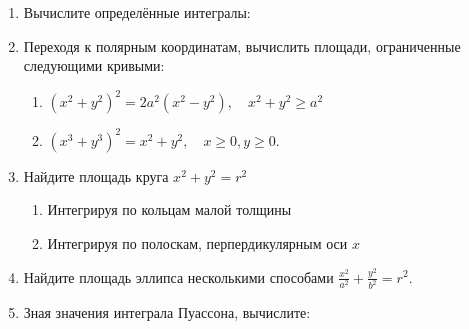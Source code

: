 \begin{enumerate}
\begin{enumerate}
\begin{minipage}{0.5\textwidth}
    \end{minipage}
    \end{enumerate}
    \item Вычислите определённые интегралы:
    \item Переходя к полярным координатам, вычислить площади, ограниченные следующими кривыми:
    \begin{enumerate}
        \item $(x^2 + y^2)^2 = 2a^2(x^2 - y^2),\quad x^2 + y^2 \ge a^2$
        \item $(x^3 + y^3)^2 = x^2 + y^2, \quad x \ge 0, y \ge 0.$
    \end{enumerate}
    \item Найдите площадь круга $x^2+y^2=r^2$ 
    \begin{enumerate}
        \item Интегрируя по кольцам малой толщины
        \item Интегрируя по полоскам, перпердикулярным оси $x$
    \end{enumerate}
    \item Найдите площадь эллипса несколькими способами $\displaystyle \frac{x^2}{a^2}+\frac{y^2}{b^2}=r^2$.
    \item Зная значения интеграла Пуассона, вычислите:
\end{enumerate}
